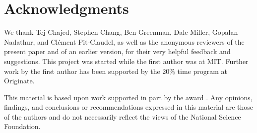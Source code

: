 \documentclass[acmsmall,screen]{acmart}
\begin{document}


\maketitle

{
  \setlength{\parskip}{3pt}
  \renewcommand{\labelitemi}{\textendash}

  \identDialog{}


  

  
  
  
  
  
  
  
  
  

  

  
  
  
  
  

  

  

  \identNormal{}

  \section*{Acknowledgments}
  We thank Tej Chajed, Stephen Chang, Ben Greenman, Dale Miller, Gopalan Nadathur, and Cl{\'e}ment Pit-Claudel, as well as the anonymous reviewers of the present paper and of an earlier version, for their very helpful
  feedback and suggestions. This project was started while the first author was at MIT.
  Further work by the first author has been supported by the 20\% time program
  at Originate.

  This material is based upon work supported in part by the  award
  .  Any opinions, findings, and conclusions or
  recommendations expressed in this material are those of the authors
  and do not necessarily reflect the views of the National Science
  Foundation.

}


\end{document}

